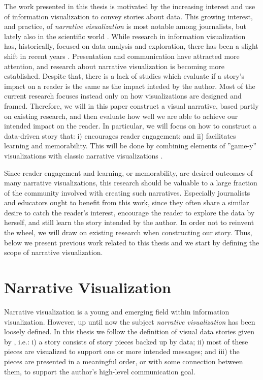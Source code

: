 \documentclass[a4paper,11pt,oldfontcommands]{packages/kth-mag}
\begin{document}
The work presented in this thesis is motivated by the increasing interest and use of information visualization to convey stories about data. This growing interest, and practice, of \emph{narrative visualization} is most notable among journalists, but lately also in the scientific world \cite{eccles2008stories,ma2012scientific}. While research in information visualization has, historically, focused on data analysis and exploration, there has been a slight shift in recent years \cite{kosara2013storytelling}. Presentation and communication have attracted more attention, and research about narrative visualization is becoming more established. Despite that, there is a lack of studies which evaluate if a story's impact on a reader is the same as the impact inteded by the author. Most of the current research focuses instead only on how visualizations are designed and framed. Therefore, we will in this paper construct a visual narrative, based partly on existing research, and then evaluate how well we are able to achieve our intended impact on the reader. In particular, we will focus on how to construct a data-driven story that: i) encourages reader engagement; and ii) facilitates learning and memorability. This will be done by combining elements of ''game-y'' visualizations with classic narrative visualizations \cite{diakopoulos2011playable}. 

Since reader engagement and learning, or memorability, are desired outcomes of many narrative visualizations, this research should be valuable to a large fraction of the community involved with creating such narratives. Especially journalists and educators ought to benefit from this work, since they often share a similar desire to catch the reader's interest, encourage the reader to explore the data by herself, and still learn the story intended by the author. In order not to reinvent the wheel, we will draw on existing research when constructing our story. Thus, below we present previous work related to this thesis and we start by defining the scope of narrative visualization.

\section{Narrative Visualization}
Narrative visualization is a young and emerging field within information visualization. However, up until now the subject \emph{narrative visualization} has been loosely defined. In this thesis we follow the definition of visual data stories given by \citet{lee2015more}, i.e.: i) a story consists of story pieces backed up by data; ii) most of these pieces are visualized to support one or more intended messages; and iii) the pieces are presented in a meaningful order, or with some connection between them, to support the author's high-level communication goal.
\end{document}
